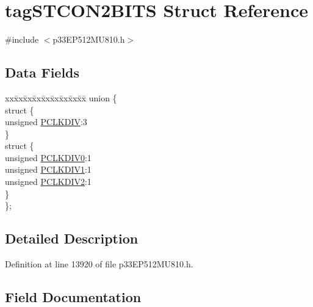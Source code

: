 \hypertarget{structtag_s_t_c_o_n2_b_i_t_s}{}\section{tag\+S\+T\+C\+O\+N2\+B\+I\+TS Struct Reference}
\label{structtag_s_t_c_o_n2_b_i_t_s}


{\ttfamily \#include $<$p33\+E\+P512\+M\+U810.\+h$>$}

\subsection*{Data Fields}
\begin{DoxyCompactItemize}
\item 
\begin{tabbing}
xx\=xx\=xx\=xx\=xx\=xx\=xx\=xx\=xx\=\kill
union \{\\
\>struct \{\\
\>\>unsigned \hyperlink{structtag_s_t_c_o_n2_b_i_t_s_a1d6ebf745e14e65a0a5ce03b92be678f}{PCLKDIV}:3\\
\>\} \\
\>struct \{\\
\>\>unsigned \hyperlink{structtag_s_t_c_o_n2_b_i_t_s_a4babd593aa4d5301df370110fccaab93}{PCLKDIV0}:1\\
\>\>unsigned \hyperlink{structtag_s_t_c_o_n2_b_i_t_s_a47741aceac6a8ba4602843a6e4c31e51}{PCLKDIV1}:1\\
\>\>unsigned \hyperlink{structtag_s_t_c_o_n2_b_i_t_s_a8ddd287d47ae49f7593f9e051fc67c00}{PCLKDIV2}:1\\
\>\} \\
\}; \\

\end{tabbing}\end{DoxyCompactItemize}


\subsection{Detailed Description}


Definition at line 13920 of file p33\+E\+P512\+M\+U810.\+h.



\subsection{Field Documentation}
\mbox{\label{structtag_s_t_c_o_n2_b_i_t_s_a366e2770ff2530433d4b68daf792a989}} 

